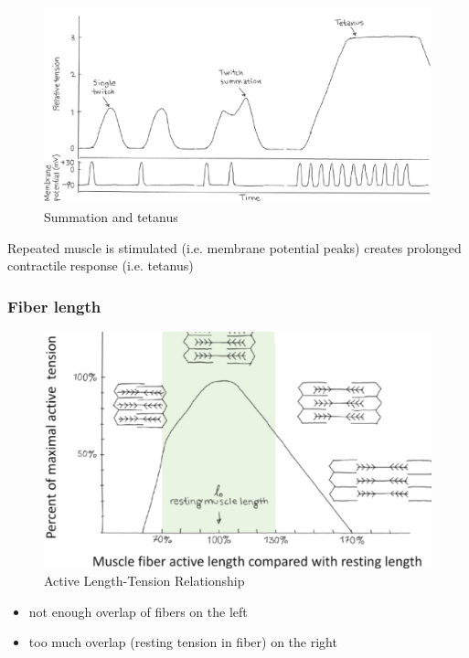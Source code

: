 \documentclass[11pt,fleqn]{book}
\begin{document}
\begin{figure}[h!]
\begin{center}
    \includegraphics[width=0.65\linewidth]{Pictures/Screenshot 2024-04-03 225826.png}
    \caption{Summation and tetanus}
\end{center}
\end{figure}


\begin{remark}
    Repeated muscle is stimulated (i.e.
membrane potential peaks) creates
prolonged contractile response (i.e.
tetanus)
\end{remark}

\subsubsection{Fiber length}
\begin{figure}[h!]
\begin{center}
    \includegraphics[width=0.4\linewidth]{Pictures/Screenshot 2024-04-03 232654.png}
    \caption{Active Length-Tension Relationship}
\end{center}
\end{figure}


\begin{remark}
    \begin{itemize}
        \item not enough overlap of fibers on the left
        \item too much overlap (resting tension in fiber) on the right
    \end{itemize}
\end{remark}
\end{document}
